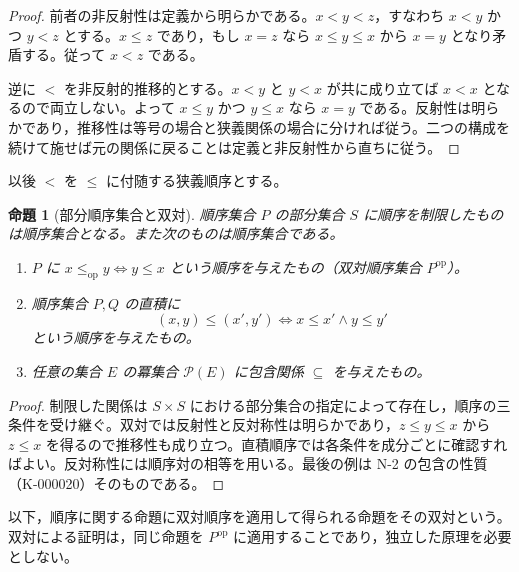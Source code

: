 \documentclass[a5paper,10pt,dvipdfmx]{jsarticle}
\theoremstyle{definition}
\theoremstyle{plain}
\newtheorem{prop}[ruledef]{命題}
\newcommand{\iffc}{\Longleftrightarrow}
\newcommand{\Pow}{\mathcal{P}}
\begin{document}
\begin{proof}
前者の非反射性は定義から明らかである。$x<y<z$，すなわち $x<y$ かつ $y<z$ とする。$x\leq z$ であり，もし $x=z$ なら $x\leq y\leq x$ から $x=y$ となり矛盾する。従って $x<z$ である。

逆に $<$ を非反射的推移的とする。$x<y$ と $y<x$ が共に成り立てば $x<x$ となるので両立しない。よって $x\leq y$ かつ $y\leq x$ なら $x=y$ である。反射性は明らかであり，推移性は等号の場合と狭義関係の場合に分ければ従う。二つの構成を続けて施せば元の関係に戻ることは定義と非反射性から直ちに従う。
\end{proof}
以後 $<$ を $\leq$ に付随する狭義順序とする。
\begin{prop}[部分順序集合と双対]\label{k70}
順序集合 $P$ の部分集合 $S$ に順序を制限したものは順序集合となる。また次のものは順序集合である。
\begin{enumerate}
\item $P$ に $x\leq_{\mathrm{op}}y\iffc y\leq x$ という順序を与えたもの（双対順序集合 $P^{\mathrm{op}}$）。
\item 順序集合 $P,Q$ の直積に
\[
 (x,y)\leq (x',y')\iffc x\leq x'\land y\leq y'
\]
という順序を与えたもの。
\item 任意の集合 $E$ の冪集合 $\Pow(E)$ に包含関係 $\subseteq$ を与えたもの。
\end{enumerate}
\end{prop}
\begin{proof}
制限した関係は $S\times S$ における部分集合の指定によって存在し，順序の三条件を受け継ぐ。双対では反射性と反対称性は明らかであり，$z\leq y\leq x$ から $z\leq x$ を得るので推移性も成り立つ。直積順序では各条件を成分ごとに確認すればよい。反対称性には順序対の相等を用いる。最後の例は N-2 の包含の性質（K-000020）そのものである。
\end{proof}
以下，順序に関する命題に双対順序を適用して得られる命題をその双対という。双対による証明は，同じ命題を $P^{\mathrm{op}}$ に適用することであり，独立した原理を必要としない。
\end{document}

